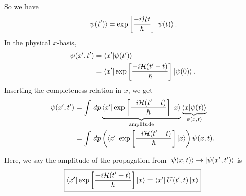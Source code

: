 \documentclass{book}
\theoremstyle{definition}
\newcommand{\ham}{\mathcal{H}}
\newcommand{\f}[2]{\frac{#1}{#2}}
\newcommand{\lp}{\left(}
\newcommand{\rp}{\right)}
\newcommand{\lb}{\left[}
\newcommand{\rb}{\right]}
\begin{document}
So we have
\begin{align}
\ket{\psi(t')} = \exp \lb \f{-i \ham t}{\hbar} \rb \ket{\psi(t)}.
\end{align}
In the physical $x$-basis, 
\begin{align}
\psi(x',t') &= \bra{x'}\ket{\psi(t')}\\
&= \bra{x'}\exp \lb \f{-i \ham (t'-t)}{\hbar} \rb \ket{\psi(0)}.
\end{align}
Inserting the completeness relation in $x$, we get
\begin{align}
\psi(x',t') &= \int \,dp \underbrace{ \bra{x'}\exp \lb \f{-i \ham (t'-t)}{\hbar} \rb \ket{x}}_{\text{amplitude}}\underbrace{\braket{x}{\psi(t)}}_{\psi(x,t)}\\ 
&=  \int \,dp \lp \bra{x'}\exp \lb \f{-i \ham (t'-t)}{\hbar} \rb \ket{x} \rp \psi(x,t).
\end{align}


Here, we say the amplitude of the propagation from $\ket{\psi(x,t)} \to \ket{\psi(x',t')}$ is 
\begin{align}
\boxed{\bra{x'}\exp \lb \f{-i \ham (t'-t)}{\hbar} \rb \ket{x} = \bra{x'}U(t',t)\ket{x}}
\end{align}
\end{document}
